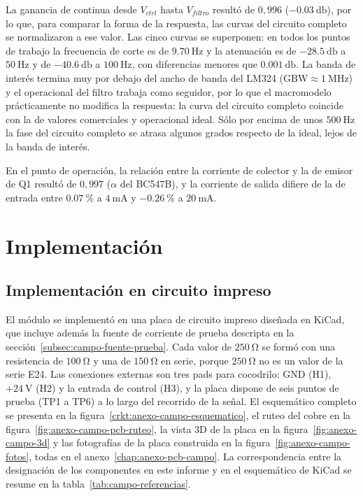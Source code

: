 La ganancia de continua desde $V_{ctrl}$ hasta $V_{filtro}$ resultó de $0{,}996$ ($\SI{-0.03}{\decibel}$), por
lo que, para comparar la forma de la respuesta, las curvas del circuito completo se normalizaron a ese valor. Las
cinco curvas se superponen: en todos los puntos de trabajo la frecuencia de corte es de $\SI{9.70}{\hertz}$ y la
atenuación es de $\SI{-28.5}{\decibel}$ a $\SI{50}{\hertz}$ y de $\SI{-40.6}{\decibel}$ a $\SI{100}{\hertz}$, con
diferencias menores que $\SI{0.001}{\decibel}$. La banda de interés termina muy por debajo del ancho de banda del
LM324 ($\text{GBW} \approx \SI{1}{\mega\hertz}$) y el operacional del filtro trabaja como seguidor, por lo que el
macromodelo prácticamente no modifica la respuesta: la curva del circuito completo coincide con la de valores
comerciales y operacional ideal. Sólo por encima de unos $\SI{500}{\hertz}$ la fase del circuito completo se atrasa
algunos grados respecto de la ideal, lejos de la banda de interés.

En el punto de operación, la relación entre la corriente de colector y la de emisor de Q1 resultó de $0{,}997$
($\alpha$ del BC547B), y la corriente de salida difiere de la de entrada entre $\SI{+0.07}{\percent}$ a
$\SI{4}{\milli\ampere}$ y $\SI{-0.26}{\percent}$ a $\SI{20}{\milli\ampere}$.

\section{Implementación}
\label{sec:campo-implementacion}

\subsection{Implementación en circuito impreso}
\label{subsec:campo-pcb}

El módulo se implementó en una placa de circuito impreso diseñada en KiCad, que incluye además la fuente de
corriente de prueba descripta en la sección~\ref{subsec:campo-fuente-prueba}. Cada valor de $\SI{250}{\ohm}$ se
formó con una resistencia de $\SI{100}{\ohm}$ y una de $\SI{150}{\ohm}$ en serie, porque $\SI{250}{\ohm}$ no es un
valor de la serie E24. Las conexiones externas son tres pads para cocodrilo: GND (H1), $+\SI{24}{\volt}$ (H2) y la
entrada de control (H3), y la placa dispone de seis puntos de prueba (TP1 a TP6) a lo largo del recorrido de la
señal. El esquemático completo se presenta en la figura~\ref{crkt:anexo-campo-esquematico}, el ruteo del cobre en
la figura~\ref{fig:anexo-campo-pcb-ruteo}, la vista 3D de la placa en la figura~\ref{fig:anexo-campo-3d} y las
fotografías de la placa construida en la figura~\ref{fig:anexo-campo-fotos}, todas en el
anexo~\ref{chap:anexo-pcb-campo}. La correspondencia entre la designación de los componentes en este informe y en el
esquemático de KiCad se resume en la tabla~\ref{tab:campo-referencias}.

